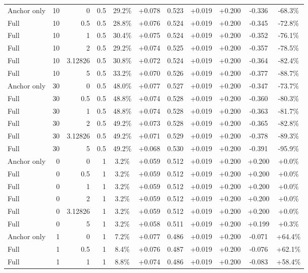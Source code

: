 \begin{table}[htbp]
\begin{tabular}{lrrrccccccc}
Anchor only & 10 & 0 & 0.5 & 29.2\% & +0.078 & 0.523 & +0.019 & +0.200 & -0.336 & -68.3\% \\
Full & 10 & 0.5 & 0.5 & 28.8\% & +0.076 & 0.524 & +0.019 & +0.200 & -0.345 & -72.8\% \\
Full & 10 & 1 & 0.5 & 30.4\% & +0.075 & 0.524 & +0.019 & +0.200 & -0.352 & -76.1\% \\
Full & 10 & 2 & 0.5 & 29.2\% & +0.074 & 0.525 & +0.019 & +0.200 & -0.357 & -78.5\% \\
Full & 10 & 3.12826 & 0.5 & 30.8\% & +0.072 & 0.524 & +0.019 & +0.200 & -0.364 & -82.4\% \\
Full & 10 & 5 & 0.5 & 33.2\% & +0.070 & 0.526 & +0.019 & +0.200 & -0.377 & -88.7\% \\
Anchor only & 30 & 0 & 0.5 & 48.0\% & +0.077 & 0.527 & +0.019 & +0.200 & -0.347 & -73.7\% \\
Full & 30 & 0.5 & 0.5 & 48.8\% & +0.074 & 0.528 & +0.019 & +0.200 & -0.360 & -80.3\% \\
Full & 30 & 1 & 0.5 & 48.8\% & +0.074 & 0.528 & +0.019 & +0.200 & -0.363 & -81.7\% \\
Full & 30 & 2 & 0.5 & 49.2\% & +0.073 & 0.528 & +0.019 & +0.200 & -0.365 & -82.8\% \\
Full & 30 & 3.12826 & 0.5 & 49.2\% & +0.071 & 0.529 & +0.019 & +0.200 & -0.378 & -89.3\% \\
Full & 30 & 5 & 0.5 & 49.2\% & +0.068 & 0.530 & +0.019 & +0.200 & -0.391 & -95.9\% \\
Anchor only & 0 & 0 & 1 & 3.2\% & +0.059 & 0.512 & +0.019 & +0.200 & +0.200 & +0.0\% \\
Full & 0 & 0.5 & 1 & 3.2\% & +0.059 & 0.512 & +0.019 & +0.200 & +0.200 & +0.0\% \\
Full & 0 & 1 & 1 & 3.2\% & +0.059 & 0.512 & +0.019 & +0.200 & +0.200 & +0.0\% \\
Full & 0 & 2 & 1 & 3.2\% & +0.059 & 0.512 & +0.019 & +0.200 & +0.200 & +0.0\% \\
Full & 0 & 3.12826 & 1 & 3.2\% & +0.059 & 0.512 & +0.019 & +0.200 & +0.200 & +0.0\% \\
Full & 0 & 5 & 1 & 3.2\% & +0.058 & 0.511 & +0.019 & +0.200 & +0.199 & +0.3\% \\
Anchor only & 1 & 0 & 1 & 7.2\% & +0.077 & 0.486 & +0.019 & +0.200 & -0.071 & +64.4\% \\
Full & 1 & 0.5 & 1 & 8.4\% & +0.076 & 0.487 & +0.019 & +0.200 & -0.076 & +62.1\% \\
Full & 1 & 1 & 1 & 8.8\% & +0.074 & 0.486 & +0.019 & +0.200 & -0.083 & +58.4\% \\

\end{tabular}
\end{table}
